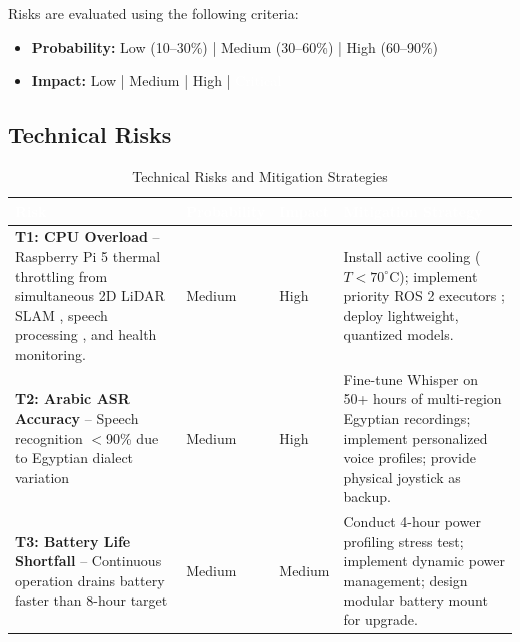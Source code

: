 \documentclass[12pt,a4paper]{report}
\renewcommand{\arraystretch}{1.45}
\renewcommand{\arraystretch}{1.3}
\begin{document}
Risks are evaluated using the following criteria:
\begin{itemize}[leftmargin=*,itemsep=2pt]
    \item \textbf{Probability:} \colorbox{lowgreen}{Low (10--30\%)} | \colorbox{mediumyellow}{Medium (30--60\%)} | \colorbox{highpink}{High (60--90\%)}
    \item \textbf{Impact:} \colorbox{lowgreen}{Low} | \colorbox{mediumyellow}{Medium} | \colorbox{highpink}{High} | \colorbox{criticalred}{\textcolor{white}{Critical}}
\end{itemize}

\subsection{Technical Risks}

\begin{table}[H]
\centering
\caption{Technical Risks and Mitigation Strategies}
\label{tab:tech_risks}
{\renewcommand{\arraystretch}{2.0}
\begin{tabularx}{\textwidth}{@{}p{3cm}p{2cm}p{1.5cm}X@{}}
\toprule
\rowcolor{riskheader}
\textcolor{white}{\textbf{Risk}} & \textcolor{white}{\textbf{Probability}} & \textcolor{white}{\textbf{Impact}} & \textcolor{white}{\textbf{Mitigation Strategy}} \\
\midrule
\rowcolor{lightgray}
\textbf{T1: CPU Overload} -- Raspberry Pi 5 thermal throttling from simultaneous 2D LiDAR SLAM \cite{tu2025design}, speech processing , and health monitoring. &\cellcolor{mediumyellow}Medium & \cellcolor{highpink}High &Install active cooling ($T < 70^{\circ}\text{C}$); implement priority ROS 2 executors \cite{ros2}; deploy lightweight, quantized models. \\
\midrule
\rowcolor{lightgray}
\textbf{T2: Arabic ASR Accuracy} -- Speech recognition $<$90\% due to Egyptian dialect variation  &
\cellcolor{mediumyellow}Medium & \cellcolor{highpink}High &
Fine-tune Whisper on 50+ hours of multi-region Egyptian recordings; implement personalized voice profiles; provide physical joystick as backup. \\
\midrule
\textbf{T3: Battery Life Shortfall} -- Continuous operation drains battery faster than 8-hour target \cite{iso7176_4} &
\cellcolor{mediumyellow}Medium & \cellcolor{mediumyellow}Medium &
Conduct 4-hour power profiling stress test; implement dynamic power management; design modular battery mount for upgrade. \\
\bottomrule
\end{tabularx}}
\end{table}
\end{document}
